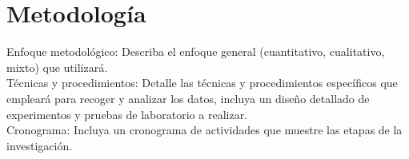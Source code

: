\chapter{Metodología}

Enfoque metodológico: Describa el enfoque general (cuantitativo, cualitativo, mixto) que utilizará. 
\\[1cm]
Técnicas y procedimientos: Detalle las técnicas y procedimientos específicos que empleará para recoger y analizar los datos, incluya un diseño detallado de experimentos y pruebas de laboratorio a realizar.
\\[1cm]
Cronograma: Incluya un cronograma de actividades que muestre las etapas de la investigación.

